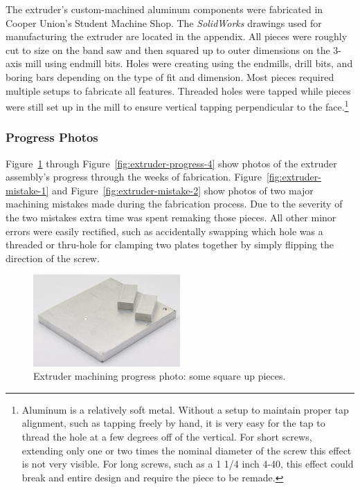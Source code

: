 \indent

The extruder's custom-machined aluminum components were fabricated in Cooper Union's Student Machine Shop. The \emph{SolidWorks} drawings used for manufacturing the extruder are located in the appendix. All pieces were roughly cut to size on the band saw and then squared up to outer dimensions on the 3-axis mill using endmill bits. Holes were creating using the endmills, drill bits, and boring bars depending on the type of fit and dimension. Most pieces required multiple setups to fabricate all features. Threaded holes were tapped while pieces were still set up in the mill to ensure vertical tapping perpendicular to the face.\footnote{Aluminum is a relatively soft metal. Without a setup to maintain proper tap alignment, such as tapping freely by hand, it is very easy for the tap to thread the hole at a few degrees off of the vertical. For short screws, extending only one or two times the nominal diameter of the screw this effect is not very visible. For long screws, such as a 1 1/4 inch 4-40, this effect could break and entire design and require the piece to be remade.}\\

\subsubsection{Progress Photos}


\indent

Figure~\ref{fig:extruder-progress-square} through Figure~\ref{fig:extruder-progress-4} show photos of the extruder assembly's progress through the weeks of fabrication. Figure~\ref{fig:extruder-mistake-1} and Figure~\ref{fig:extruder-mistake-2} show photos of two major machining mistakes made during the fabrication process. Due to the severity of the two mistakes extra time was spent remaking those pieces. All other minor errors were easily rectified, such as accidentally swapping which hole was a threaded or thru-hole for clamping two plates together by simply flipping the direction of the screw.\\

\begin{figure}[h!]
\centering
\includegraphics[width=0.5\textwidth]{./figures/extruder-progress-square}
\caption{Extruder machining progress photo: some square up pieces.}
\label{fig:extruder-progress-square}
\end{figure}

